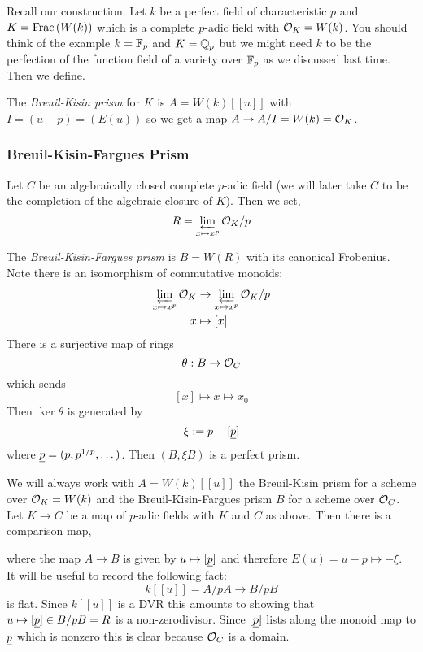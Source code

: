 \documentclass[12pt]{article}
\begin{document}
Recall our construction. Let $k$ be a perfect field of characteristic $p$ and $K = \mathrm{Frac}\left(W(k)\right)$ which is a complete $p$-adic field with $\mathcal{O}_K = W(k)$. You should think of the example $k = \mathbb{F}_p$ and $K = \mathbb{Q}_p$ but we might need $k$ to be the perfection of the function field of a variety over $\mathbb{F}_p$ as we discussed last time. Then we define.

\begin{defn}
The \textit{Breuil-Kisin prism} for $K$ is $A = W(k)[[u]]$ with $I = (u - p) = (E(u))$ so we get a map $A \to A/I = W(k) = \mathcal{O}_K$. 
\end{defn} 

\subsubsection{Breuil-Kisin-Fargues Prism}

Let $C$ be an algebraically closed complete $p$-adic field (we will later take $C$ to be the completion of the algebraic closure of $K$). Then we set,
\[ R = \operatorname*{\varprojlim}_{x \mapsto x^p} \mathcal{O}_K / p \]
\begin{defn}
The \textit{Breuil-Kisin-Fargues prism} is $B = W(R)$ with its canonical Frobenius. Note there is an isomorphism of commutative monoids:
\begin{align*} 
\operatorname*{\varprojlim}_{x \mapsto x^p} \mathcal{O}_K & \to \operatorname*{\varprojlim}_{x \mapsto x^p} \mathcal{O}_K / p 
\\
x & \mapsto [x]
\end{align*}
There is a surjective map of rings
\[ \theta : B \to \mathcal{O}_C \] 
which sends 
\[ [x] \mapsto x \mapsto x_0 \]
Then $\ker{\theta}$ is generated by
\[ \xi := p - [\underline{p}] \]
where $\underline{p} = (p, p^{1/p}, \dots)$. Then $(B, \xi B)$ is a perfect prism. 
\end{defn}

We will always work with $A = W(k)[[u]]$ the Breuil-Kisin prism for a scheme over $\mathcal{O}_K = W(k)$ and the Breuil-Kisin-Fargues prism $B$ for a scheme over $\mathcal{O}_C$.
\bigskip\\
Let $K \to C$ be a map of $p$-adic fields with $K$ and $C$ as above. Then there is a comparison map,
\begin{center}
\end{center}
where the map $A \to B$ is given by $u \mapsto [\underline{p}]$ and therefore $E(u) = u - p \mapsto -\xi$. 
\bigskip\\
It will be useful to record the following fact:
\[ k[[u]] = A / p A \to B / p B \]
is flat. Since $k[[u]]$ is a DVR this amounts to showing that $u \mapsto [\underline{p}] \in B / p B = R$ is a non-zerodivisor. Since $[\underline{p}]$ lists along the monoid map to $\underline{p}$ which is nonzero this is clear because $\mathcal{O}_C$ is a domain.
\end{document}
